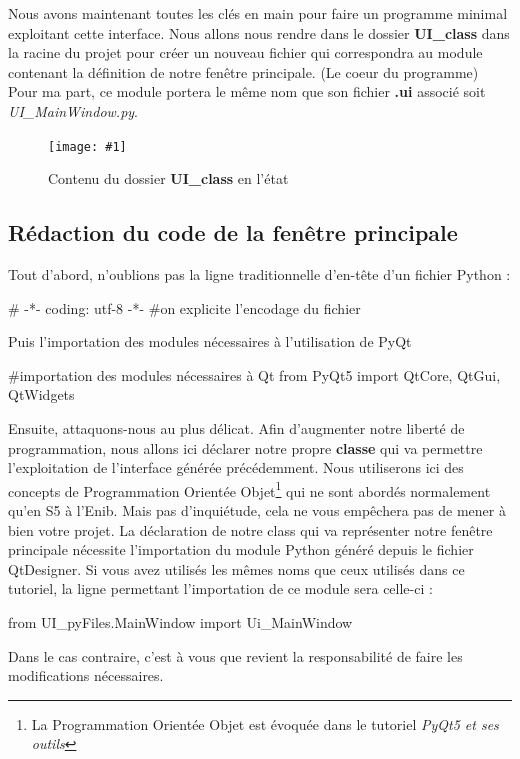 \documentclass[12pt]{report}    %
\newcommand{\iImage}[3]{\begin{figure}[H]\centering\texttt{[image: \#1]}\caption{#2}\end{figure}}
\newcommand{\bold}[1]{{\bfseries #1}}
\newcommand{\italic}[1]{{\itshape #1}}
\newcommand{\smallSkip}{\vskip 0.5cm}
\newcommand{\rootIm}{images/ENIBSupervision/}
\begin{document}
Nous avons maintenant toutes les clés en main pour faire un programme minimal exploitant cette interface.\newline
Nous allons nous rendre dans le dossier \bold{UI\_class} dans la racine du projet pour créer un nouveau fichier qui correspondra au module contenant la définition de notre fenêtre principale. (Le coeur du programme)\newline
Pour ma part, ce module portera le même nom que son fichier \bold{*.ui} associé soit \italic{UI\_MainWindow.py}.

\iImage{\rootIm enibSup_window_explorer_UIClass_basic.png}{Contenu du dossier \bold{UI\_class} en l'état}{0.4}

\subsection{Rédaction du code de la fenêtre principale}

Tout d'abord, n'oublions pas la ligne traditionnelle d'en-tête d'un fichier Python :
\begin{pyCode}
# -*- coding: utf-8 -*-
#on explicite l'encodage du fichier
\end{pyCode}
Puis l'importation des modules nécessaires à l'utilisation de PyQt
\begin{pyCode}
#importation des modules nécessaires à Qt
from PyQt5 import QtCore, QtGui, QtWidgets
\end{pyCode}

Ensuite, attaquons-nous au plus délicat.\newline
Afin d'augmenter notre liberté de programmation, nous allons ici déclarer notre propre \bold{classe} qui va permettre l'exploitation de l'interface générée précédemment. Nous utiliserons ici des concepts de Programmation Orientée Objet\footnote{La Programmation Orientée Objet est évoquée dans le tutoriel \italic{PyQt5 et ses outils}} qui ne sont abordés normalement qu'en S5 à l'Enib. Mais pas d'inquiétude, cela ne vous empêchera pas de mener à bien votre projet.\newline
La déclaration de notre class qui  va représenter notre fenêtre principale nécessite l'importation du module Python généré depuis le fichier QtDesigner. Si vous avez utilisés les mêmes noms que ceux utilisés dans ce tutoriel, la ligne permettant l'importation de ce module sera celle-ci :
\begin{pyCode}
from UI_pyFiles.MainWindow import Ui_MainWindow
\end{pyCode}
Dans le cas contraire, c'est à vous que revient la responsabilité de faire les modifications nécessaires.\smallSkip %
\end{document}
